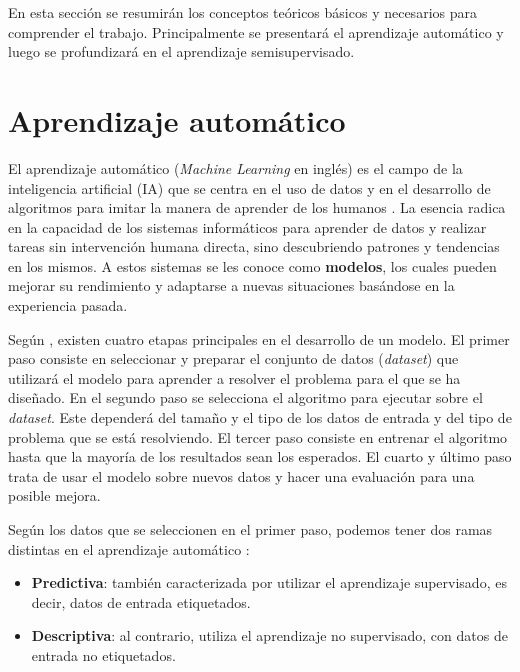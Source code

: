 \label{sec3}

En esta sección se resumirán los conceptos teóricos básicos y necesarios para comprender el trabajo. Principalmente se presentará el aprendizaje automático y luego se profundizará en el aprendizaje semisupervisado.

\section{Aprendizaje automático}
El aprendizaje automático (\textit{Machine Learning} en inglés) es el campo de la inteligencia artificial (IA) que se centra en el uso de datos y en el desarrollo de algoritmos para imitar la manera de aprender de los humanos \cite{ML:ibm}. La esencia radica en la capacidad de los sistemas informáticos para aprender de datos y realizar tareas sin intervención humana directa, sino descubriendo patrones y tendencias en los mismos. A estos sistemas se les conoce como \textbf{modelos}, los cuales pueden mejorar su rendimiento y adaptarse a nuevas situaciones basándose en la experiencia pasada.

Según \cite{ML:DataScientest}, existen cuatro etapas principales en el desarrollo de un modelo. El primer paso consiste en seleccionar y preparar el conjunto de datos (\textit{dataset}) que utilizará el modelo para aprender a resolver el problema para el que se ha diseñado. En el segundo paso se selecciona el algoritmo para ejecutar sobre el \textit{dataset}. Este dependerá del tamaño y el tipo de los datos de entrada y del tipo de problema que se está resolviendo. El tercer paso consiste en entrenar el algoritmo hasta que la mayoría de los resultados sean los esperados. El cuarto y último paso trata de usar el modelo sobre nuevos datos y hacer una evaluación para una posible mejora.

Según los datos que se seleccionen en el primer paso, podemos tener dos ramas distintas en el aprendizaje automático \cite{ML:SisInt}:
\begin{itemize}
	\item \textbf{Predictiva}: también caracterizada por utilizar el aprendizaje supervisado, es decir, datos de entrada etiquetados.
	\item \textbf{Descriptiva}: al contrario, utiliza el aprendizaje no supervisado, con datos de entrada no etiquetados.
\end{itemize}

 
